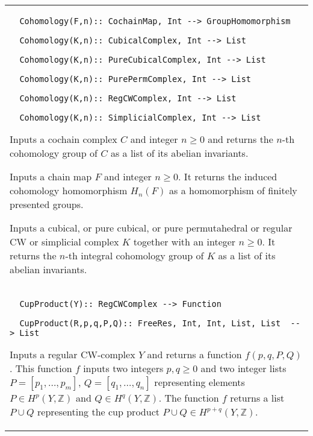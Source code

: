 \documentclass[a4paper,11pt]{report}
\begin{document}
{\begin{center}
\begin{tabular}{|l|}
\begin{verbatim}  Cohomology(F,n):: CochainMap, Int --> GroupHomomorphism
\end{verbatim}
 
\begin{verbatim}  Cohomology(K,n):: CubicalComplex, Int --> List
\end{verbatim}
 
\begin{verbatim}  Cohomology(K,n):: PureCubicalComplex, Int --> List
\end{verbatim}
 
\begin{verbatim}  Cohomology(K,n):: PurePermComplex, Int --> List
\end{verbatim}
 
\begin{verbatim}  Cohomology(K,n):: RegCWComplex, Int --> List
\end{verbatim}
 
\begin{verbatim}  Cohomology(K,n):: SimplicialComplex, Int --> List
\end{verbatim}


 

 Inputs a cochain complex $C$ and integer $n \ge 0$ and returns the $n$-th cohomology group of $C$ as a list of its abelian invariants. 

 Inputs a chain map $F$ and integer $n \ge 0$. It returns the induced cohomology homomorphism $H_n(F)$ as a homomorphism of finitely presented groups. 

 Inputs a cubical, or pure cubical, or pure permutahedral or regular CW or
simplicial complex $K$ together with an integer $n \ge 0$. It returns the $n$-th integral cohomology group of $K$ as a list of its abelian invariants. \\
 \index{CupProduct} 
\begin{verbatim}  CupProduct(Y):: RegCWComplex --> Function
\end{verbatim}
 
\begin{verbatim}  CupProduct(R,p,q,P,Q):: FreeRes, Int, Int, List, List  --> List
\end{verbatim}


 

 Inputs a regular CW-complex $Y$ and returns a function $f(p,q,P,Q)$. This function $f$ inputs two integers $p,q \ge 0$ and two integer lists $P=[p_1, \ldots, p_m]$, $Q=[q_1, \ldots, q_n]$ representing elements $P\in H^p(Y,\mathbb Z)$ and $Q\in H^q(Y,\mathbb Z)$. The function $f$ returns a list $P \cup Q$ representing the cup product $P \cup Q \in H^{p+q}(Y,\mathbb Z)$. 


\end{tabular}
\end{center}}
\end{document}
